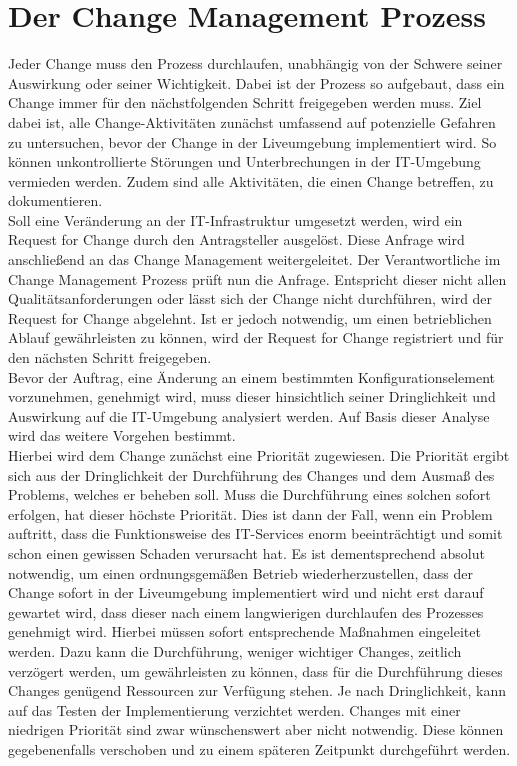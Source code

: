 \section{Der Change Management Prozess}
\vspace{-0.1cm}
Jeder Change muss den Prozess durchlaufen, unabhängig von der Schwere  seiner Auswirkung oder seiner Wichtigkeit. Dabei ist der Prozess so aufgebaut, dass ein Change immer für den nächstfolgenden Schritt freigegeben werden muss. Ziel dabei ist, alle Change-Aktivitäten zunächst umfassend auf potenzielle Gefahren zu untersuchen, bevor der Change in der Liveumgebung implementiert wird. So können unkontrollierte Störungen und Unterbrechungen in der IT-Umgebung vermieden werden. Zudem sind alle Aktivitäten, die einen Change betreffen, zu dokumentieren. 
\\
Soll eine Veränderung an der IT-Infrastruktur umgesetzt werden, wird ein Request for Change durch den Antragsteller ausgelöst. Diese Anfrage wird anschließend an das Change Management weitergeleitet. Der Verantwortliche im Change Management Prozess prüft nun die Anfrage. Entspricht dieser nicht allen Qualitätsanforderungen oder lässt sich der Change nicht durchführen, wird der Request for Change abgelehnt. Ist er jedoch notwendig, um einen betrieblichen Ablauf gewährleisten zu können, wird der Request for Change registriert und für den nächsten Schritt freigegeben. 
\\
Bevor der Auftrag, eine Änderung an einem bestimmten Konfigurationselement vorzunehmen, genehmigt wird, muss dieser hinsichtlich seiner Dringlichkeit und Auswirkung auf die IT-Umgebung analysiert werden. Auf Basis dieser Analyse wird das weitere Vorgehen bestimmt. 
\\
Hierbei wird dem Change zunächst eine Priorität zugewiesen. Die Priorität ergibt sich aus der Dringlichkeit der Durchführung des Changes und dem Ausmaß des Problems, welches er beheben soll. Muss die Durchführung eines solchen sofort erfolgen, hat dieser höchste Priorität. Dies ist dann der Fall, wenn ein Problem auftritt, dass die Funktionsweise des IT-Services enorm beeinträchtigt und somit schon einen gewissen Schaden verursacht hat. Es ist dementsprechend absolut notwendig, um einen ordnungsgemäßen Betrieb wiederherzustellen, dass der Change sofort in der Liveumgebung implementiert wird und nicht erst darauf gewartet wird, dass dieser nach einem langwierigen durchlaufen des Prozesses genehmigt wird. Hierbei müssen sofort entsprechende Maßnahmen eingeleitet werden. Dazu kann die Durchführung, weniger wichtiger Changes, zeitlich verzögert werden, um gewährleisten zu können, dass für die Durchführung dieses Changes genügend Ressourcen zur Verfügung stehen. Je nach Dringlichkeit, kann auf das Testen der Implementierung verzichtet werden. Changes mit einer niedrigen Priorität sind zwar wünschenswert aber nicht notwendig. Diese können gegebenenfalls verschoben und zu einem späteren Zeitpunkt durchgeführt werden.
